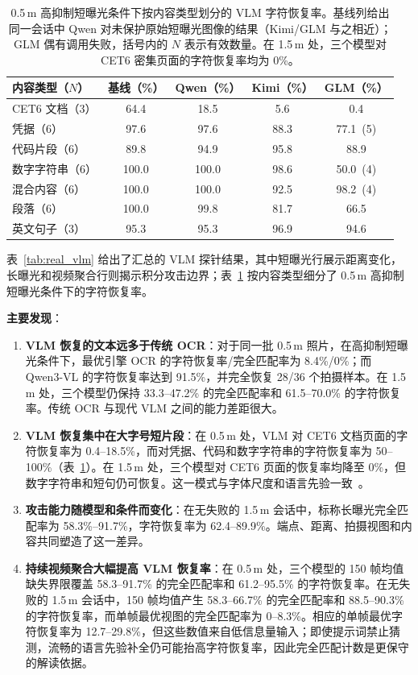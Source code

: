 \documentclass{ieeeaccess}
\begin{document}
\begin{table}[!t]
\caption{0.5\,m 高抑制短曝光条件下按内容类型划分的 VLM 字符恢复率。基线列给出同一会话中 Qwen 对未保护原始短曝光图像的结果（Kimi/GLM 与之相近）；GLM 偶有调用失败，括号内的 $N$ 表示有效数量。在 1.5\,m 处，三个模型对 CET6 密集页面的字符恢复率均为 0\%。}
\label{tab:vlm_content}
\centering
\footnotesize
\setlength{\tabcolsep}{2.8pt}
\begin{tabular}{lcccc}
\toprule
内容类型（$N$） & 基线（\%） & Qwen（\%） & Kimi（\%） & GLM（\%） \\
\midrule
CET6 文档（3） & 64.4 & 18.5 & 5.6 & 0.4 \\
凭据（6） & 97.6 & 97.6 & 88.3 & 77.1~(5) \\
代码片段（6） & 89.8 & 94.9 & 95.8 & 88.9 \\
数字字符串（6） & 100.0 & 100.0 & 98.6 & 50.0~(4) \\
混合内容（6） & 100.0 & 100.0 & 92.5 & 98.2~(4) \\
段落（6） & 100.0 & 99.8 & 81.7 & 66.5 \\
英文句子（3） & 95.3 & 95.3 & 96.9 & 94.6 \\
\bottomrule
\end{tabular}
\end{table}

表~\ref{tab:real_vlm} 给出了汇总的 VLM 探针结果，其中短曝光行展示距离变化，长曝光和视频聚合行则揭示积分攻击边界；表~\ref{tab:vlm_content} 按内容类型细分了 0.5\,m 高抑制短曝光条件下的字符恢复率。

\textbf{主要发现}：

\begin{enumerate}
\item \textbf{VLM 恢复的文本远多于传统 OCR}：对于同一批 0.5\,m 照片，在高抑制短曝光条件下，最优引擎 OCR 的字符恢复率/完全匹配率为 8.4\%/0\%；而 Qwen3-VL 的字符恢复率达到 91.5\%，并完全恢复 28/36 个拍摄样本。在 1.5\,m 处，三个模型仍保持 33.3--47.2\% 的完全匹配率和 61.5--70.0\% 的字符恢复率。传统 OCR 与现代 VLM 之间的能力差距很大。

\item \textbf{VLM 恢复集中在大字号短片段}：在 0.5\,m 处，VLM 对 CET6 文档页面的字符恢复率为 0.4--18.5\%，而对凭据、代码和数字字符串的字符恢复率为 50--100\%（表~\ref{tab:vlm_content}）。在 1.5\,m 处，三个模型对 CET6 页面的恢复率均降至 0\%，但数字字符串和短句仍可恢复。这一模式与字体尺度和语言先验一致~\cite{b_shi2023,b_jiang2025}。

\item \textbf{攻击能力随模型和条件而变化}：在无失败的 1.5\,m 会话中，标称长曝光完全匹配率为 58.3\%--91.7\%，字符恢复率为 62.4--89.9\%。端点、距离、拍摄视图和内容共同塑造了这一差异。

\item \textbf{持续视频聚合大幅提高 VLM 恢复率}：在 0.5\,m 处，三个模型的 150 帧均值缺失界限覆盖 58.3--91.7\% 的完全匹配率和 61.2--95.5\% 的字符恢复率。在无失败的 1.5\,m 会话中，150 帧均值产生 58.3--66.7\% 的完全匹配率和 88.5--90.3\% 的字符恢复率，而单帧最优视图的完全匹配率为 0--8.3\%。相应的单帧最优字符恢复率为 12.7--29.8\%，但这些数值来自低信息量输入；即使提示词禁止猜测，流畅的语言先验补全仍可能抬高字符恢复率，因此完全匹配计数是更保守的解读依据。
\end{enumerate}
\end{document}
